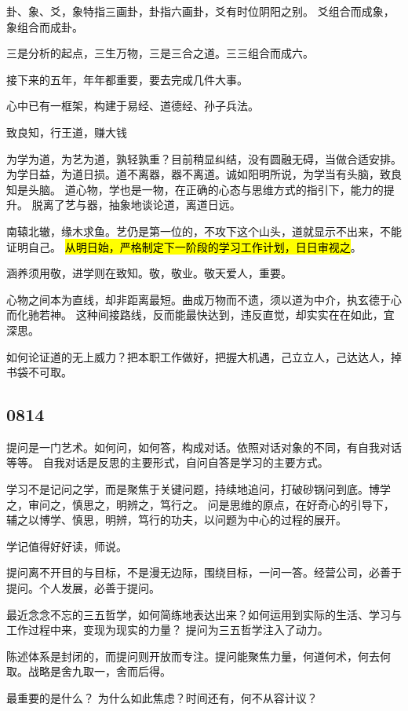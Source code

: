 卦、象、爻，象特指三画卦，卦指六画卦，爻有时位阴阳之别。
爻组合而成象，象组合而成卦。

三是分析的起点，三生万物，三是三合之道。三三组合而成六。

接下来的五年，年年都重要，要去完成几件大事。

心中已有一框架，构建于易经、道德经、孙子兵法。

致良知，行王道，赚大钱

为学为道，为艺为道，孰轻孰重？目前稍显纠结，没有圆融无碍，当做合适安排。
为学日益，为道日损。道不离器，器不离道。诚如阳明所说，为学当有头脑，致良知是头脑。
道心物，学也是一物，在正确的心态与思维方式的指引下，能力的提升。
脱离了艺与器，抽象地谈论道，离道日远。

南辕北辙，缘木求鱼。艺仍是第一位的，不攻下这个山头，道就显示不出来，不能证明自己。
\hl{从明日始，严格制定下一阶段的学习工作计划，日日审视之}。

涵养须用敬，进学则在致知。敬，敬业。敬天爱人，重要。

心物之间本为直线，却非距离最短。曲成万物而不遗，须以道为中介，执玄德于心而化驰若神。
这种间接路线，反而能最快达到，违反直觉，却实实在在如此，宜深思。

如何论证道的无上威力？把本职工作做好，把握大机遇，己立立人，己达达人，掉书袋不可取。

\subsection{0814}

提问是一门艺术。如何问，如何答，构成对话。依照对话对象的不同，有自我对话等等。
自我对话是反思的主要形式，自问自答是学习的主要方式。

学习不是记问之学，而是聚焦于关键问题，持续地追问，打破砂锅问到底。博学之，审问之，慎思之，明辨之，笃行之。
问是思维的原点，在好奇心的引导下，辅之以博学、慎思，明辨，笃行的功夫，以问题为中心的过程的展开。

学记值得好好读，师说。

提问离不开目的与目标，不是漫无边际，围绕目标，一问一答。经营公司，必善于提问。个人发展，必善于提问。

最近念念不忘的三五哲学，如何简练地表达出来？如何运用到实际的生活、学习与工作过程中来，变现为现实的力量？
提问为三五哲学注入了动力。

陈述体系是封闭的，而提问则开放而专注。提问能聚焦力量，何道何术，何去何取。战略是舍九取一，舍而后得。

最重要的是什么？ 为什么如此焦虑？时间还有，何不从容计议？

